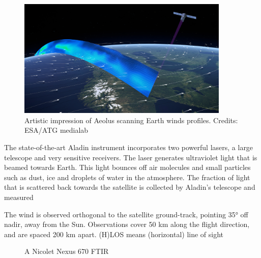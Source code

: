 \begin{figure}[h]
	\centering
	\includegraphics[width=0.9\textwidth]{img/Winds_profile.jpg}
	\caption{Artistic impression of Aeolus scanning Earth winds profiles.
	Credits: ESA/ATG medialab \cite{scanning}}
	\label{fig:scanning}
\end{figure}



The state-of-the-art Aladin instrument incorporates two powerful lasers, a large telescope and very sensitive receivers. The laser generates ultraviolet light that is beamed towards Earth. This light bounces off air molecules and small particles such as dust, ice and droplets of water in the atmosphere. The fraction of light that is scattered back towards the satellite is collected by Aladin’s telescope and measured


The wind is observed orthogonal to the satellite ground-track, pointing 35° off nadir, away from the Sun. Observations cover 50 km along the flight direction, and are spaced 200 km apart.
(H)LOS means (horizontal) line of sight

\begin{figure}[h]
	\centering
	\caption{A Nicolet Nexus 670 FTIR}
	\label{fig:machinery}
\end{figure}
